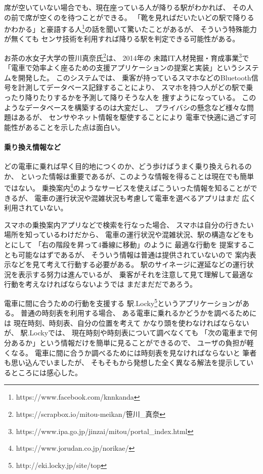 \documentclass[twocolumn,10pt]{jarticle}
\begin{document}
席が空いていない場合でも、現在座っている人が降りる駅がわかれば、
その人の前で席が空くのを待つことができる。
「靴を見ればだいたいどの駅で降りるかわかる」と豪語する人\footnote{
  \textsf{https://www.facebook.com/knnkanda}
}の話を聞いて驚いたことがあるが、
そういう特殊能力が無くても
センサ技術を利用すれば降りる駅を判定できる可能性がある。

お茶の水女子大学の笹川真奈氏\footnote{
  \textsf{https://scrapbox.io/mitou-meikan/笹川\_真奈}
}は、
2014年の
未踏IT人材発掘・育成事業\footnote{
  \textsf{https://www.ipa.go.jp/jinzai/mitou/portal\_index.html}
}で「電車で効率よく座るための支援アプリケーションの提案と実装」というシステムを開発した。
このシステムでは、
乗客が持っているスマホなどのBluetooth信号を計測してデータベース記録することにより、
スマホを持つ人がどの駅で乗ったり降りたりするかを予測して降りそうな人を
捜すようになっている。
このようなデータベースを構築するのは大変だし、
プライバシの懸念など様々な問題はあるが、
センサやネット情報を駆使することにより
電車で快適に過ごす可能性があることを示した点は面白い。

\paragraph{乗り換え情報など}
  
どの電車に乗れば早く目的地につくのか、どう歩けばうまく乗り換えられるのか、
といった情報は重要であるが、このような情報を得ることは現在でも簡単ではない。
乗換案内\footnote{
  \textsf{https://www.jorudan.co.jp/norikae/}
}のようなサービスを使えばこういった情報を知ることができるが、
電車の運行状況や混雑状況も考慮して電車を選べるアプリはまだ
広く利用されていない。

スマホの乗換案内アプリなどで検索を行なった場合、
スマホは自分の行きたい場所を知っているわけだから、
電車の運行状況や混雑状況、駅の構造などをもとにして
「右の階段を昇って4番線に移動」のように 最適な行動を
提案することも可能なはずであるが、
そういう情報は普通は提供されていないので
案内表示などを見て考えて行動する必要がある。
駅のサイネージに遅延などの運行状況を表示する努力は進んでいるが、
乗客がそれを注意して見て理解して最適な行動を考えなければならないようでは
まだまだだであろう。

電車に間に合うための行動を支援する
駅.Locky\footnote{
  \textsf{http://eki.locky.jp/site/top}
}というアプリケーションがある。
普通の時刻表を利用する場合、
ある電車に乗れるかどうかを調べるためには
現在時刻、時刻表、自分の位置を考えて
かなり頭を使わなければならないが、
駅.Lockyでは、
現在時刻や時刻表について調べなくても
「次の電車まで何分あるか」という情報だけを簡単に見ることができるので、
ユーザの負担が軽くなる。
電車に間に合うか調べるためには時刻表を見なければならないと
筆者も思い込んでいましたが、
そもそもから発想した全く異なる解法を提示しているところには感心した。
\end{document}

